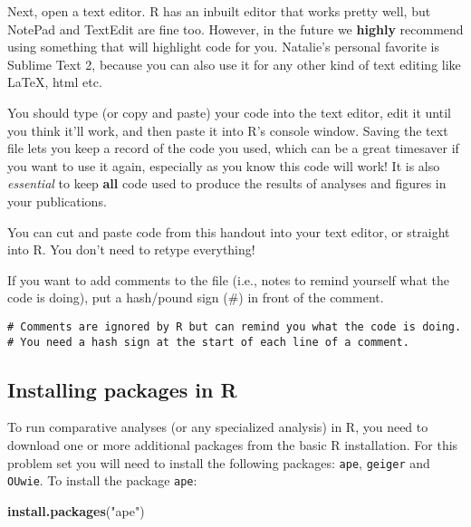 \documentclass[11pt]{article}
\newcommand{\KeywordTok}[1]{\textcolor[rgb]{0.13,0.29,0.53}{\textbf{{#1}}}}
\newcommand{\StringTok}[1]{\textcolor[rgb]{0.31,0.60,0.02}{{#1}}}
\newcommand{\NormalTok}[1]{{#1}}
\begin{document}
Next, open a text editor. R has an inbuilt editor that works pretty
well, but NotePad and TextEdit are fine too. However, in the future we
\textbf{highly} recommend using something that will highlight code for
you. Natalie's personal favorite is Sublime Text 2, because you can also use
it for any other kind of text editing like LaTeX, html etc.

You should type (or copy and paste) your code into the text editor, edit
it until you think it'll work, and then paste it into R's console
window. Saving the text file lets you keep a record of the code you
used, which can be a great timesaver if you want to use it again,
especially as you know this code will work! It is also \emph{essential} to
keep \textbf{all} code used to produce the results of analyses and figures
in your publications.

\begin{framed}
You can cut and paste code from this handout into your text editor, or 
straight into R. You don't need to retype everything!
\end{framed}

If you want to add comments to the file (i.e., notes to remind yourself
what the code is doing), put a hash/pound sign (\#) in front of the
comment.

\begin{snugshade}
\texttt{\# Comments are ignored by R but can remind you what the code is doing.\\}
\texttt{\# You need a hash sign at the start of each line of a comment.}
\end{snugshade}

\subsection{Installing packages in R}\label{installing-packages}
\label{install}
To run comparative analyses (or any specialized analysis) in R, you need to 
download one or more additional packages from the basic R installation. 
For this problem set you will need to install the following packages: 
\texttt{ape}, \texttt{geiger} and \texttt{OUwie}. 
To install the package \texttt{ape}:

\begin{snugshade}
\begin{Highlighting}[]
\KeywordTok{install.packages}\NormalTok{(}\StringTok{"ape"}\NormalTok{)}
\end{Highlighting}
\end{snugshade}
\end{document}
